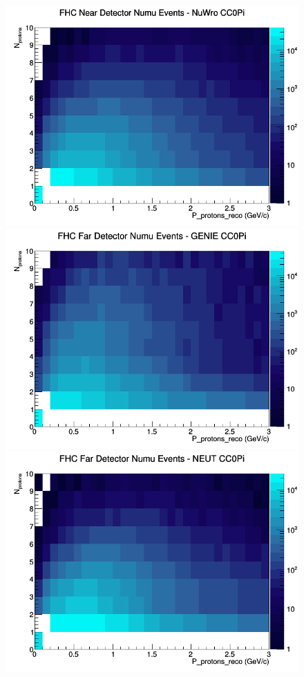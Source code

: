 \begin{figure}[h]
\includegraphics[width=\linewidth]{eff_N_P/LAr/protons/CC0Pi_FHC_ND_numu_N_P_NuWro.png}
\endminipage
\newline
{}
\includegraphics[width=\linewidth]{eff_N_P/LAr/protons/CC0Pi_FHC_FD_numu_N_P_GENIE.png}
\endminipage
{}
\includegraphics[width=\linewidth]{eff_N_P/LAr/protons/CC0Pi_FHC_FD_numu_N_P_NEUT.png}

\end{figure}
